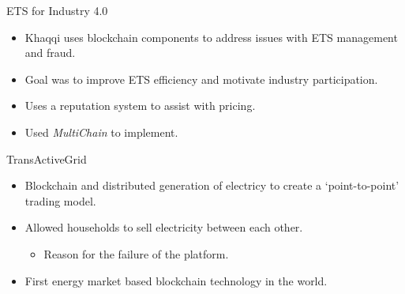 \begin{frame}{ETS for Industry 4.0}
    \begin{itemize}
        \item Khaqqi uses blockchain components to address issues with
              ETS management and fraud.
        \item Goal was to improve ETS efficiency and motivate industry
              participation.
        \item Uses a reputation system to assist with pricing.
        \item Used \textit{MultiChain} to implement.
    \end{itemize}
\end{frame}
\begin{frame}{TransActiveGrid}
    \begin{itemize}
        \item Blockchain and distributed generation of electricy to create a
              `point-to-point' trading model.
        \item Allowed households to sell electricity between each other.
              \begin{itemize}
                  \item Reason for the failure of the platform.
              \end{itemize}
        \item First energy market based blockchain technology in the world.
    \end{itemize}
\end{frame}
